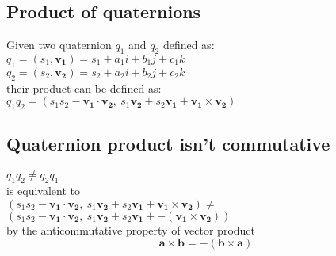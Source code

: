 \subsection{Product of quaternions}
Given two quaternion $q_1$ and $q_2$ defined as: \\
$q_1 = (s_1,\boldsymbol{v_1})=s_1+a_1i+b_1j+c_1k$ \\
$q_2=(s_2,\boldsymbol{v_2})=s_2+a_2i+b_2j+c_2k$ \\
their product can be defined as: \\
$q_1 q_2 = (s_1 s_2 - \boldsymbol{v_1 \cdot v_2}, \ s_1 \boldsymbol{v_2} + s_2 \boldsymbol{v_1} + \boldsymbol{v_1} \times \boldsymbol{v_2})$

\subsection{Quaternion product isn't commutative}
$q_1 q_2 \neq q_2 q_1$  \\
is equivalent to \\
$(s_1 s_2 - \boldsymbol{v_1 \cdot v_2}, \ s_1 \boldsymbol{v_2} + s_2 \boldsymbol{v_1} + \boldsymbol{v_1} \times \boldsymbol{v_2}) \neq $
$(s_1 s_2 - \boldsymbol{v_1 \cdot v_2}, \ s_1 \boldsymbol{v_2} + s_2 \boldsymbol{v_1} + - (\boldsymbol{v_1} \times \boldsymbol{v_2}))$ \\
by the anticommutative property of vector product \cite{amslaurea6701} \\
$$ \boldsymbol{a} \times \boldsymbol{b} = - (\boldsymbol{b} \times \boldsymbol{a}) $$ 

